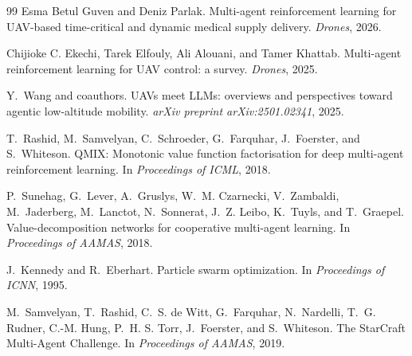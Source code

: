 \documentclass[sigconf,balance=false]{aamas}
\begin{document}
\begin{thebibliography}{99}
Esma Betul Guven and Deniz Parlak.
Multi-agent reinforcement learning for UAV-based time-critical and dynamic medical supply delivery.
\emph{Drones}, 2026.

Chijioke C. Ekechi, Tarek Elfouly, Ali Alouani, and Tamer Khattab.
Multi-agent reinforcement learning for UAV control: a survey.
\emph{Drones}, 2025.

Y.~Wang and coauthors.
UAVs meet LLMs: overviews and perspectives toward agentic low-altitude mobility.
\emph{arXiv preprint arXiv:2501.02341}, 2025.

T.~Rashid, M.~Samvelyan, C.~Schroeder, G.~Farquhar, J.~Foerster, and S.~Whiteson.
QMIX: Monotonic value function factorisation for deep multi-agent reinforcement learning.
In \emph{Proceedings of ICML}, 2018.

P.~Sunehag, G.~Lever, A.~Gruslys, W.~M. Czarnecki, V.~Zambaldi, M.~Jaderberg, M.~Lanctot, N.~Sonnerat, J.~Z. Leibo, K.~Tuyls, and T.~Graepel.
Value-decomposition networks for cooperative multi-agent learning.
In \emph{Proceedings of AAMAS}, 2018.

J.~Kennedy and R.~Eberhart.
Particle swarm optimization.
In \emph{Proceedings of ICNN}, 1995.

M.~Samvelyan, T.~Rashid, C.~S. de Witt, G.~Farquhar, N.~Nardelli, T.~G. Rudner, C.-M. Hung, P.~H. S. Torr, J.~Foerster, and S.~Whiteson.
The StarCraft Multi-Agent Challenge.
In \emph{Proceedings of AAMAS}, 2019.

\end{thebibliography}
\end{document}
